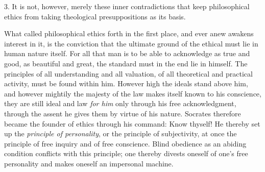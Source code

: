 \documentclass[12pt,a4paper,openany]{book}
\begin{document}
3. It is not, however, merely these inner contradictions that keep philosophical ethics from taking
theological presuppositions as its basis.

What called philosophical ethics forth in the first place, and ever anew awakens interest in it, is
the conviction that the ultimate ground of the ethical must lie in human nature itself. For all that
man is to be able to acknowledge as true and good, as beautiful and great, the standard must in the
end lie in himself. The principles of all understanding and all valuation, of all theoretical and
practical activity, must be found within him. However high the ideals stand above him, and however
mightily the majesty of the law makes itself known to his conscience, they are still ideal and law
\textit{for him} only through his free acknowledgment, through the assent he gives them by virtue of
his nature. Socrates therefore became the founder of ethics through his command: Know thyself! He
thereby set up the \textit{principle of personality}, or the principle of subjectivity, at once the
principle of free inquiry and of free conscience. Blind obedience as an abiding condition conflicts
with this principle; one thereby divests oneself of one's free personality and makes oneself an
impersonal machine.
\end{document}
